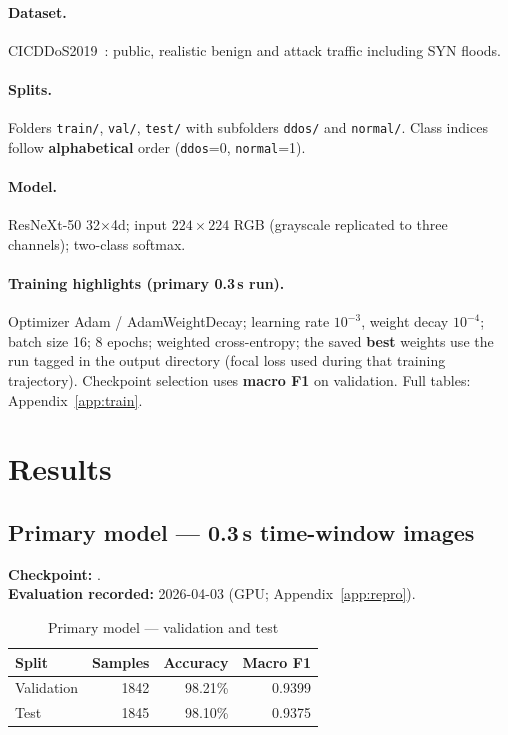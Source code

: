 \documentclass[11pt,a4paper]{article}
\begin{document}
\paragraph{Dataset.}
CICDDoS2019~\cite{cicddos2019}: public, realistic benign and attack traffic including SYN floods.

\paragraph{Splits.}
Folders \texttt{train/}, \texttt{val/}, \texttt{test/} with subfolders \texttt{ddos/} and \texttt{normal/}. Class indices follow \textbf{alphabetical} order (\texttt{ddos}=0, \texttt{normal}=1).

\paragraph{Model.}
ResNeXt-50 32$\times$4d; input $224{\times}224$ RGB (grayscale replicated to three channels); two-class softmax.

\paragraph{Training highlights (primary 0.3\,s run).}
Optimizer Adam / AdamWeightDecay; learning rate $10^{-3}$, weight decay $10^{-4}$; batch size 16; 8 epochs; weighted cross-entropy; the saved \textbf{best} weights use the run tagged  in the output directory (focal loss used during that training trajectory). Checkpoint selection uses \textbf{macro F1} on validation. Full tables: Appendix~\ref{app:train}.

\section{Results}

\subsection[Primary model (0.3 s time-window)]{Primary model --- 0.3\,s time-window images}

\noindent\textbf{Checkpoint:} .\\
\textbf{Evaluation recorded:} 2026-04-03 (GPU; Appendix~\ref{app:repro}).

\begin{table}[h]
  \centering
  \caption{Primary model --- validation and test}
  \begin{tabular}{@{}lrrr@{}}
    \toprule
    Split & Samples & Accuracy & Macro F1 \\
    \midrule
    Validation & 1842 & 98.21\% & 0.9399 \\
    Test       & 1845 & 98.10\% & 0.9375 \\
    \bottomrule
  \end{tabular}
\end{table}
\end{document}
